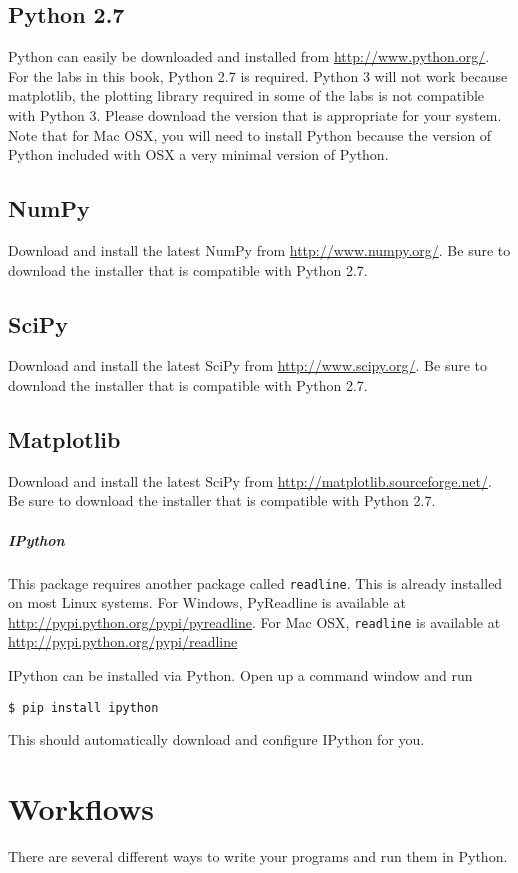 \subsection*{Python 2.7}
Python can easily be downloaded and installed from \url{http://www.python.org/}.  For the labs in this book, Python 2.7 is required.  Python 3 will not work because matplotlib, the plotting library required in some of the labs is not compatible with Python 3.  Please download the version that is appropriate for your system.  Note that for Mac OSX, you will need to install Python because the version of Python included with OSX a very minimal version of Python.

\subsection*{NumPy}
Download and install the latest NumPy from \url{http://www.numpy.org/}.  Be sure to download the installer that is compatible with Python 2.7.

\subsection*{SciPy}
Download and install the latest SciPy from \url{http://www.scipy.org/}.  Be sure to download the installer that is compatible with Python 2.7.

\subsection*{Matplotlib}
Download and install the latest SciPy from \url{http://matplotlib.sourceforge.net/}.  Be sure to download the installer that is compatible with Python 2.7.

\subparagraph*{IPython}
This package requires another package called \texttt{readline}.  This is already installed on most Linux systems.  For Windows, PyReadline is available at \url{http://pypi.python.org/pypi/pyreadline}.  For Mac OSX, \texttt{readline} is available at \url{http://pypi.python.org/pypi/readline}

IPython can be installed via Python.  Open up a command window and run
\begin{lstlisting}
$ pip install ipython
\end{lstlisting}

This should automatically download and configure IPython for you.

\section*{Workflows}
There are several different ways to write your programs and run them in Python.

